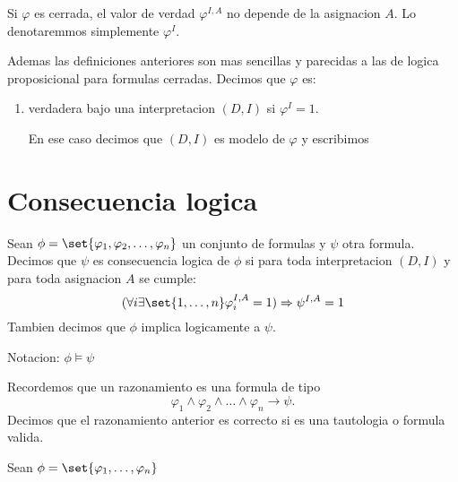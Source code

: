 \begin{remark}
	Si \(\varphi\) es cerrada, el valor de verdad \(\varphi^{I,A } \) no depende de la asignacion \(A \). Lo denotaremmos simplemente \(\varphi^{I } \).

	Ademas las definiciones anteriores son mas sencillas y parecidas a las de logica proposicional para formulas cerradas. Decimos que \(\varphi\) es:
	\begin{enumerate}
		\item verdadera bajo una interpretacion \((D,I )\) si \(\varphi^{I } = 1 \).

		      En ese caso decimos que \((D,I )\) es modelo de \(\varphi\) y escribimos
	\end{enumerate}
\end{remark}

\section{Consecuencia logica}
\begin{definition}
	Sean \(\phi = \set{\varphi_1,\varphi_2,\ldots,\varphi_n}\) un conjunto de formulas y \(\psi \) otra formula. Decimos que \(\psi \) es consecuencia logica de \(\phi\) si para toda interpretacion \((D,I )\) y para toda asignacion \(A \) se cumple:
	\[
		(\forall i \exists \set{1,\ldots,n} \varphi^{I,A}_{i} = 1 ) \Rightarrow \psi^{I,A} = 1
	\]
	Tambien decimos que \(\phi\) implica logicamente a \(\psi \).

	Notacion: \(\phi \vDash \psi \)
\end{definition}

\begin{definition}
	Recordemos que un razonamiento es una formula de tipo
	\[
		\varphi_1 \wedge \varphi_2 \wedge \ldots \wedge \varphi_n \rightarrow \psi.
	\]
	Decimos que el razonamiento anterior es correcto si es una tautologia o formula valida.
\end{definition}
\begin{proposition}
	Sean \(\phi = \set{\varphi_1,\ldots,\varphi_n }\)
\end{proposition}


